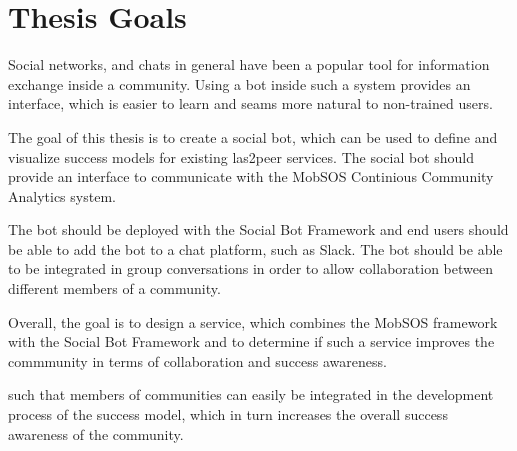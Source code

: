 \section{Thesis Goals}

Social networks, and chats in general have been a popular tool for information exchange inside a community. Using a bot inside such a system provides an interface, which is easier to learn and seams more natural to non-trained users.

The goal of this thesis is to create a social bot, which can be used to define and visualize success models for existing las2peer services. The social bot should provide an interface to communicate with the MobSOS Continious Community Analytics system.

The bot should be deployed with the Social Bot Framework and end users should be able to add the bot to a chat platform, such as Slack. The bot should be able to be integrated in group conversations in order to allow collaboration between different members of a community.

Overall, the goal is to design a service, which combines the MobSOS framework with the Social Bot Framework and to determine if such a service improves the commmunity in terms of collaboration and success awareness.

such that members of communities can easily be integrated in the development process of the success model, which in turn increases the overall success awareness of the community.

\blankpage
